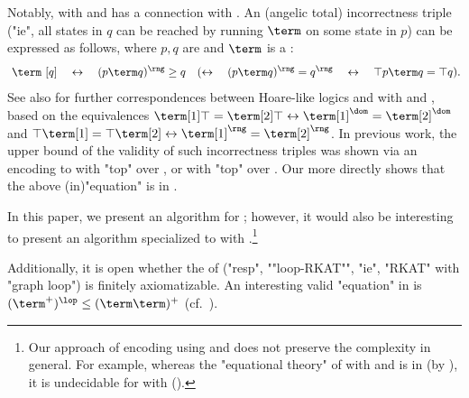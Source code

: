 \begin{scope}
%
%
%

Notably,  with  and  has a connection with \intro*{} \cite{ohearnIncorrectnessLogic2019}.
%
An (angelic total) incorrectness triple ("ie", all states in $q$ can be reached by running $\term$ on some state in $p$)
can be expressed as follows, where $p, q$ are  and $\term$ is a :
\begin{gather*}
[p]~\term~[q] \quad\leftrightarrow\quad (p \term q)^{\rng} \ge q \quad(\leftrightarrow\quad (p \term q)^{\rng} = q^{\rng} \quad\leftrightarrow\quad \top p \term q = \top q).
\end{gather*}
See also \cite[Table 2]{verschtTaxonomyHoareLikeLogics2025} for further correspondences between Hoare-like logics and  with  and , based on the equivalences $\term[1] \top = \term[2] \top \leftrightarrow \term[1]^{\dom} = \term[2]^{\dom}$ and $\top \term[1] = \top \term[2] \leftrightarrow \term[1]^{\rng} = \term[2]^{\rng}$.
In previous work, the  upper bound of the validity of such incorrectness triples was shown via an encoding to  with "top" over  \cite{nakamuraExistentialCalculiRelations2023,pousCompletenessTheoremsKleene2024}, or  with "top" over  \cite{zhangDomainReasoningTopKAT2024}.
Our  more directly shows that the above (in)"equation" is in .

In this paper, we present an algorithm for ; however,
it would also be interesting to present an algorithm specialized to  with .\footnote{%
Our approach of encoding  using  and  does not preserve the complexity in general.
For example, whereas the "equational theory" of  with  and 
is in  (by \cite{lutzPDLNegationAtomic2005}), it is undecidable for  with  \cite{nakamuraExistentialCalculiRelations2023,nakamuraUndecidabilityEmptinessProblem2025} ().}

Additionally, it is open whether the  of  ("resp", ""loop-RKAT"", "ie",
"RKAT" with "graph loop") is finitely axiomatizable.
An interesting valid "equation" in  is $(\term^{+})^{\lop} \le (\term \term)^{+}$ (cf.~\cite[p.~14]{pousPositiveCalculusRelations2018}).

%
%
%


\end{scope}

